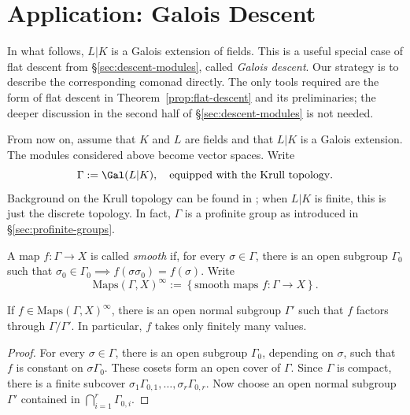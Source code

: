 
\section{Application: Galois Descent}\label{sec:descent-Galois}
\hypertarget{o014.aljabr2.chapter7.galois-descent}{ }
In what follows, $L|K$ is a Galois extension of fields. This is a useful
special case of flat descent from \S\ref{sec:descent-modules}, called
\emph{Galois descent}. Our strategy is to describe the corresponding comonad
directly. The only tools required are the form of flat descent in
Theorem~\ref{prop:flat-descent} and its preliminaries; the deeper discussion
in the second half of \S\ref{sec:descent-modules} is not needed.

From now on, assume that $K$ and $L$ are fields and that $L|K$ is a Galois
extension. The modules considered above become vector spaces. Write
\[ \Gamma := \Gal(L|K), \quad \text{equipped with the Krull topology}. \]
Background on the Krull topology can be found in
\cite[\S 4.10, \S 9.2]{Li1}; when $L|K$ is finite, this is just the discrete
topology. In fact, $\Gamma$ is a profinite group as introduced in
\S\ref{sec:profinite-groups}.

A map $f:\Gamma\to X$ is called \emph{smooth} if, for every
$\sigma\in\Gamma$, there is an open subgroup $\Gamma_0$ such that
$\sigma_0\in\Gamma_0\implies f(\sigma\sigma_0)=f(\sigma)$. Write
\[ \mathrm{Maps}(\Gamma, X)^\infty := \left\{ \text{smooth maps } f: \Gamma \to X \right\}. \]

\begin{lemma}\label{prop:smooth-map-finite}
	If $f\in\mathrm{Maps}(\Gamma,X)^\infty$, there is an open normal subgroup
	$\Gamma'$ such that $f$ factors through $\Gamma/\Gamma'$. In particular,
	$f$ takes only finitely many values.
\end{lemma}
\begin{proof}
	For every $\sigma\in\Gamma$, there is an open subgroup $\Gamma_0$,
	depending on $\sigma$, such that $f$ is constant on $\sigma\Gamma_0$.
	These cosets form an open cover of $\Gamma$. Since $\Gamma$ is compact,
	there is a finite subcover
	$\sigma_1\Gamma_{0,1},\ldots,\sigma_r\Gamma_{0,r}$. Now choose an open
	normal subgroup $\Gamma'$ contained in
	$\bigcap_{i=1}^r\Gamma_{0,i}$.
\end{proof}

